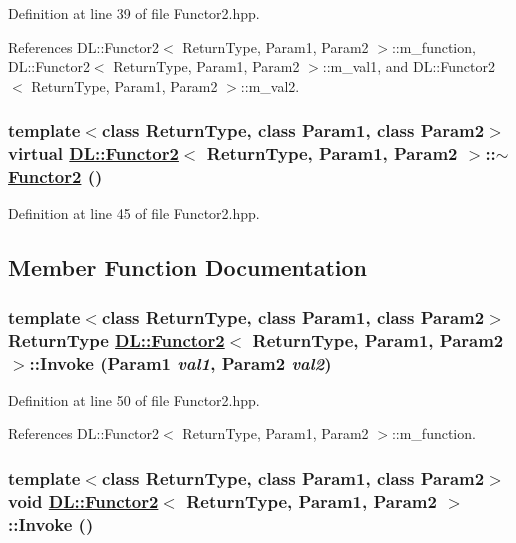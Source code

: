 Definition at line 39 of file Functor2.hpp.

References DL::Functor2$<$ Return\-Type, Param1, Param2 $>$::m\_\-function, DL::Functor2$<$ Return\-Type, Param1, Param2 $>$::m\_\-val1, and DL::Functor2$<$ Return\-Type, Param1, Param2 $>$::m\_\-val2.\hypertarget{classDL_1_1Functor2_a1}{
\subsubsection[$\sim$Functor2]{\setlength{\rightskip}{0pt plus 5cm}template$<$class Return\-Type, class Param1, class Param2$>$ virtual \hyperlink{classDL_1_1Functor2}{DL::Functor2}$<$ Return\-Type, Param1, Param2 $>$::$\sim$\hyperlink{classDL_1_1Functor2}{Functor2} ()}}
\label{classDL_1_1Functor2_a1}




Definition at line 45 of file Functor2.hpp.

\subsection{Member Function Documentation}
\hypertarget{classDL_1_1Functor2_a3}{
\subsubsection[Invoke]{\setlength{\rightskip}{0pt plus 5cm}template$<$class Return\-Type, class Param1, class Param2$>$ Return\-Type \hyperlink{classDL_1_1Functor2}{DL::Functor2}$<$ Return\-Type, Param1, Param2 $>$::Invoke (Param1 {\em val1}, Param2 {\em val2})}}
\label{classDL_1_1Functor2_a3}




Definition at line 50 of file Functor2.hpp.

References DL::Functor2$<$ Return\-Type, Param1, Param2 $>$::m\_\-function.\hypertarget{classDL_1_1Functor2_a2}{
\subsubsection[Invoke]{\setlength{\rightskip}{0pt plus 5cm}template$<$class Return\-Type, class Param1, class Param2$>$ void \hyperlink{classDL_1_1Functor2}{DL::Functor2}$<$ Return\-Type, Param1, Param2 $>$::Invoke ()}}
\label{classDL_1_1Functor2_a2}





